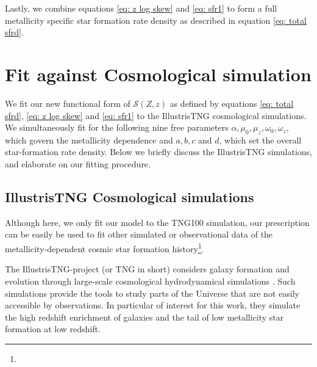 \documentclass[linenumbers,twocolumn]{aastex631}
\newcommand{\SFRDzZ}{\ensuremath{\mathcal{S}(Z,z)}\xspace}
\begin{document}
Lastly, we combine equations \ref{eq: z log skew} and \ref{eq: sfr1} to form a full metallicity specific star formation rate density as described in equation \ref{eq: total sfrd}.


\section{Fit against Cosmological simulation \label{sec: fit against tng}}

We fit our new functional form of \SFRDzZ as defined by equations \ref{eq: total sfrd}, \ref{eq: z log skew} and \ref{eq: sfr1} to the IllustrisTNG cosmological simulations. 
We simultaneously fit for the following nine free parameters $\alpha, \mu_0, \mu_z, \omega_0, \omega_z$, which govern the metallicity dependence and $a,b, c$ and $d$, which set the overall star-formation rate density.
Below we briefly discuss the IllustrisTNG simulations, and elaborate on our fitting procedure.


\subsection{IllustrisTNG Cosmological simulations}
Although here, we only fit our model to the TNG100 simulation, our prescription can be easily be used to fit other simulated or observational data of the metallicity-dependent cosmic star formation history\footnote{ }.

The IllustrisTNG-project (or TNG in short) considers galaxy formation and evolution through large-scale cosmological hydrodynamical simulations \citep[][]{FirstResTNG_Springel2018,FirstResTNG_Marinacci2018, FirstResTNG_Nelson2018,FirstResTNG_Pillepich2018, FirstResTNG_Naiman2018, Nelson2019a, Pillepich2019}.
Such simulations provide the tools to study parts of the Universe that are not easily accessible by observations. In particular of interest for this work, they simulate the high redshift enrichment of galaxies and the tail of low metallicity star formation at low redshift.
\end{document}
